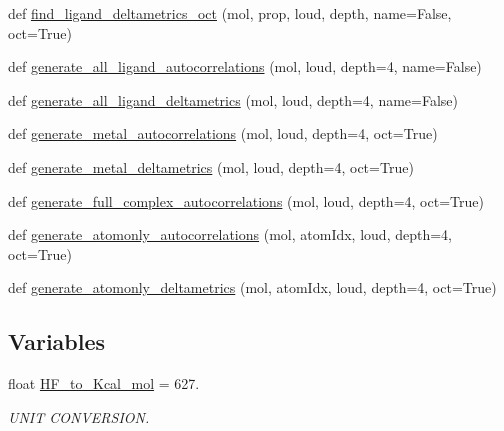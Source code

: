 \begin{DoxyCompactItemize}
\item 
def \hyperlink{namespacemolSimplify_1_1Informatics_1_1autocorrelation_a546b2f7fde3825cfd7a2c505f77d7315}{find\+\_\+ligand\+\_\+deltametrics\+\_\+oct} (mol, prop, loud, depth, name=False, oct=True)
\item 
def \hyperlink{namespacemolSimplify_1_1Informatics_1_1autocorrelation_adcf9bd154c0c7b65097d1554b133dd02}{generate\+\_\+all\+\_\+ligand\+\_\+autocorrelations} (mol, loud, depth=4, name=False)
\item 
def \hyperlink{namespacemolSimplify_1_1Informatics_1_1autocorrelation_aa9672a057f5e2e4c829f5a8ae2bfea0f}{generate\+\_\+all\+\_\+ligand\+\_\+deltametrics} (mol, loud, depth=4, name=False)
\item 
def \hyperlink{namespacemolSimplify_1_1Informatics_1_1autocorrelation_a06ea57981ada11534f3c1ab0a2088ca6}{generate\+\_\+metal\+\_\+autocorrelations} (mol, loud, depth=4, oct=True)
\item 
def \hyperlink{namespacemolSimplify_1_1Informatics_1_1autocorrelation_abeb04da5c193e664f9839a5078aecbf8}{generate\+\_\+metal\+\_\+deltametrics} (mol, loud, depth=4, oct=True)
\item 
def \hyperlink{namespacemolSimplify_1_1Informatics_1_1autocorrelation_aa42f502b07d5ec5cbca3bba5578edf03}{generate\+\_\+full\+\_\+complex\+\_\+autocorrelations} (mol, loud, depth=4, oct=True)
\item 
def \hyperlink{namespacemolSimplify_1_1Informatics_1_1autocorrelation_afee869e28e2c2d6c97906e21c05e6f90}{generate\+\_\+atomonly\+\_\+autocorrelations} (mol, atom\+Idx, loud, depth=4, oct=True)
\item 
def \hyperlink{namespacemolSimplify_1_1Informatics_1_1autocorrelation_a7383c532c21d56dce18e31b7372a33a2}{generate\+\_\+atomonly\+\_\+deltametrics} (mol, atom\+Idx, loud, depth=4, oct=True)
\end{DoxyCompactItemize}
\subsection*{Variables}
\begin{DoxyCompactItemize}
\item 
float \hyperlink{namespacemolSimplify_1_1Informatics_1_1autocorrelation_a32db0031c3a3b29b591751ef7f63a7bf}{H\+F\+\_\+to\+\_\+\+Kcal\+\_\+mol} = 627.
\begin{DoxyCompactList}\small\item\em U\+N\+IT C\+O\+N\+V\+E\+R\+S\+I\+ON. \end{DoxyCompactList}\end{DoxyCompactItemize}


